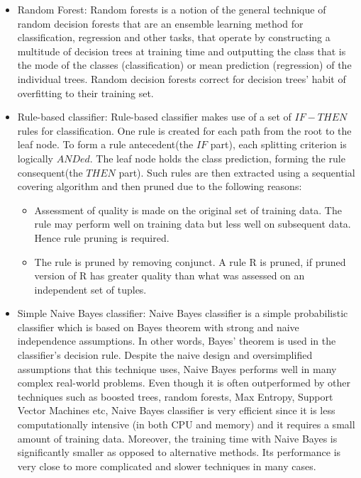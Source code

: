 \begin{itemize}
\begin{enumerate}
\begin{itemize}
\item{Random Forest: Random forests is a notion of the general technique of random decision forests that are an ensemble learning method for classification, regression and other tasks, that operate by constructing a multitude of decision trees at training time and outputting the class that is the mode of the classes (classification) or mean prediction (regression) of the individual trees. Random decision forests correct for decision trees' habit of overfitting to their training set.}

\item{Rule-based classifier: Rule-based classifier makes use of a set of $IF-THEN$ rules for classification. One rule is created for each path from the root to the leaf node. To form a rule antecedent(the $IF$ part), each splitting criterion is logically $ANDed$. The leaf node holds the class prediction, forming the rule consequent(the $THEN$ part). Such rules are then extracted using a sequential covering algorithm and then pruned due to the following reasons: }
\begin{itemize}
\item{Assessment of quality is made on the original set of training data. The rule may perform well on training data but less well on subsequent data. Hence rule pruning is required.}
\item{The rule is pruned by removing conjunct. A rule R is pruned, if pruned version of R has greater quality than what was assessed on an independent set of tuples.}
\end{itemize}

\item{Simple Naive Bayes classifier: Naive Bayes classifier is a simple probabilistic classifier which is based on Bayes theorem with strong and naive independence assumptions. In other words, Bayes' theorem is used in the classifier's decision rule.  Despite the naive design and oversimplified assumptions that this technique uses, Naive Bayes performs well in many complex real-world problems.
Even though it is often outperformed by other techniques such as boosted trees, random forests, Max Entropy, Support Vector Machines etc, Naive Bayes classifier is very efficient since it is less computationally intensive (in both CPU and memory) and it requires a small amount of training data. Moreover, the training time with Naive Bayes is significantly smaller as opposed to alternative methods.
Its performance is very close to more complicated and slower techniques in many cases.}
\end{itemize}


\end{enumerate}
\end{itemize}
